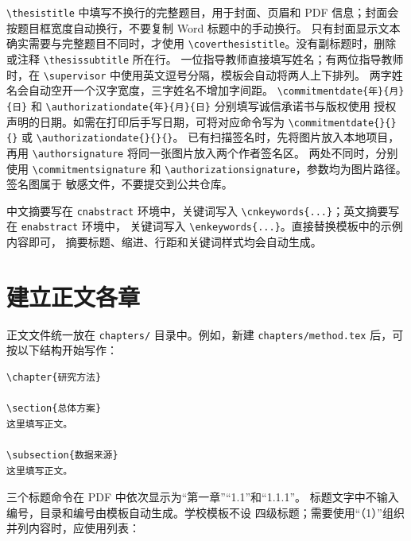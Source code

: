 \verb|\thesistitle| 中填写不换行的完整题目，用于封面、页眉和 PDF
信息；封面会按题目框宽度自动换行，不要复制 Word 标题中的手动换行。
只有封面显示文本确实需要与完整题目不同时，才使用
\verb|\coverthesistitle|。没有副标题时，删除或注释
\verb|\thesissubtitle| 所在行。
一位指导教师直接填写姓名；有两位指导教师时，在
\verb|\supervisor| 中使用英文逗号分隔，模板会自动将两人上下排列。
两字姓名会自动空开一个汉字宽度，三字姓名不增加字间距。
\verb|\commitmentdate{年}{月}{日}| 和
\verb|\authorizationdate{年}{月}{日}| 分别填写诚信承诺书与版权使用
授权声明的日期。如需在打印后手写日期，可将对应命令写为
\verb|\commitmentdate{}{}{}| 或 \verb|\authorizationdate{}{}{}|。
已有扫描签名时，先将图片放入本地项目，再用
\verb|\authorsignature| 将同一张图片放入两个作者签名区。
两处不同时，分别使用 \verb|\commitmentsignature| 和
\verb|\authorizationsignature|，参数均为图片路径。签名图属于
敏感文件，不要提交到公共仓库。

中文摘要写在 \texttt{cnabstract} 环境中，关键词写入
\verb|\cnkeywords{...}|；英文摘要写在 \texttt{enabstract} 环境中，
关键词写入 \verb|\enkeywords{...}|。直接替换模板中的示例内容即可，
摘要标题、缩进、行距和关键词样式均会自动生成。

\section{建立正文各章}

正文文件统一放在 \texttt{chapters/} 目录中。例如，新建
\texttt{chapters/method.tex} 后，可按以下结构开始写作：

\begin{lstlisting}[language={[LaTeX]TeX},float=htbp]
\chapter{研究方法}

\section{总体方案}
这里填写正文。

\subsection{数据来源}
这里填写正文。
\end{lstlisting}

三个标题命令在 PDF 中依次显示为“第一章”“1.1”和“1.1.1”。
标题文字中不输入编号，目录和编号由模板自动生成。学校模板不设
四级标题；需要使用“（1）”组织并列内容时，应使用列表：

